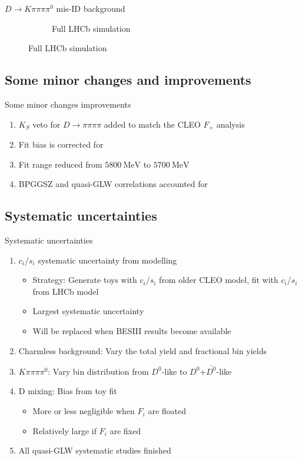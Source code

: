 \documentclass{beamer}
\begin{document}
\begin{frame}{$D\to K\pi\pi\pi\pi^0$ mis-ID background}
\begin{figure}
\begin{subfigure}{0.50\textwidth}
      \caption{Full LHCb simulation}
    \end{subfigure}
  \end{figure}
\end{frame}

\subsection{Some minor changes and improvements}
\begin{frame}{Some minor changes improvements}
  \begin{enumerate}
    \setlength\itemsep{1.5em}
    \item{$K_S$ veto for $D\to\pi\pi\pi\pi$ added to match the CLEO $F_+$ analysis}
    \item{Fit bias is corrected for}
    \item{Fit range reduced from $\SI{5800}{\mega\eV}$ to $\SI{5700}{\mega\eV}$}
    \item{BPGGSZ and quasi-GLW correlations accounted for}
  \end{enumerate}
\end{frame}

\subsection{Systematic uncertainties}
\begin{frame}{Systematic uncertainties}
  \begin{enumerate}
    \setlength\itemsep{1.0em}
    \item{$c_i$/$s_i$ systematic uncertainty from modelling}
    \begin{itemize}
      \item{Strategy: Generate toys with $c_i$/$s_i$ from older CLEO model, fit with $c_i$/$s_i$ from LHCb model}
      \item{Largest systematic uncertainty}
      \item{Will be replaced when BESIII results become available}
    \end{itemize}
    \item{Charmless background: Vary the total yield and fractional bin yields}
    \item{$K\pi\pi\pi\pi^0$: Vary bin distribution from $D^0$-like to $D^0$+$\bar{D^0}$-like}
    \item{D mixing: Bias from toy fit}
    \begin{itemize}
      \item{More or less negligible when $F_i$ are floated}
      \item{Relatively large if $F_i$ are fixed}
    \end{itemize}
    \item{All quasi-GLW systematic studies finished}
  \end{enumerate}
\end{frame}
\end{document}
